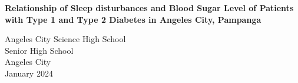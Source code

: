 \begin{titlepage}
    \thispagestyle{titlepagestyle}
    \vspace*{100pt}
    \centering
    \textbf{Relationship of Sleep disturbances and Blood Sugar Level of Patients
      with Type 1 and Type 2 Diabetes in Angeles City, Pampanga}
    \vspace{50pt}

    
    \vfill
    Angeles City Science High School\\
    Senior High School\\
    Angeles City\\

    January 2024
\end{titlepage}
